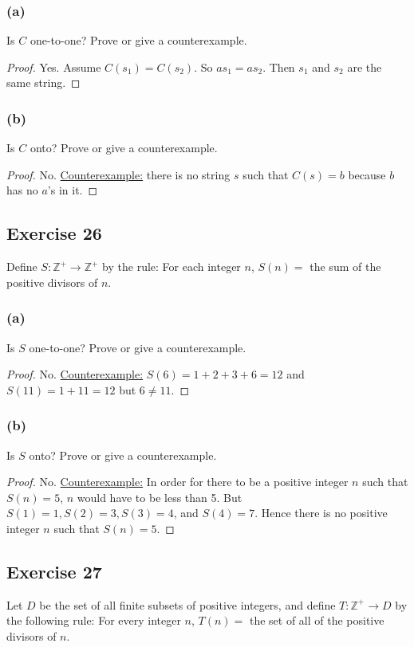 \documentclass[14pt]{extarticle}
\newcommand{\Z}{\mathbb{Z}}
\begin{document}
\subsubsection{(a)}
Is $C$ one-to-one? Prove or give a counterexample.

\begin{proof}
    Yes. Assume \(C(s_1) = C(s_2)\). So \(as_1 = as_2\). Then $s_1$ and $s_2$ are the same string.
\end{proof}

\subsubsection{(b)}
Is $C$ onto? Prove or give a counterexample.

\begin{proof}
    No. \underline{Counterexample:} there is no string $s$ such that \(C(s) = b\) because $b$ has no $a$'s in it.
\end{proof}

\subsection{Exercise 26}
Define \(S: \Z^+ \to \Z^+\) by the rule: For each integer $n$, $S(n) =$ the sum of the positive divisors of $n$.

\subsubsection{(a)}
Is $S$ one-to-one? Prove or give a counterexample.

\begin{proof}
    No. \underline{Counterexample:} \(S(6) = 1 + 2 + 3 + 6 = 12\) and \(S(11) = 1 + 11 = 12\) but \(6 \neq 11\).
\end{proof}

\subsubsection{(b)}
Is $S$ onto? Prove or give a counterexample.

\begin{proof}
    No. \underline{Counterexample:} In order for there to be a positive integer $n$ such that $S(n) = 5$, $n$ would have
    to be less than 5. But \(S(1) = 1, S(2) = 3, S(3) = 4\), and \(S(4) = 7\). Hence there is no positive integer $n$
    such that \(S(n) = 5\).
\end{proof}

\subsection{Exercise 27}
Let $D$ be the set of all finite subsets of positive integers, and define \(T: \Z^+ \to D\) by the following
rule: For every integer $n$, $T(n) =$ the set of all of the positive divisors of $n$.
\end{document}
